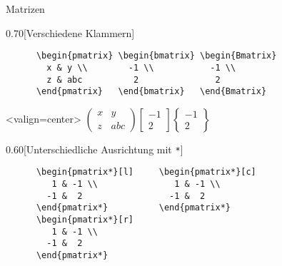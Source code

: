 \begin{frame}[fragile]{
  Matrizen
  \hfill{}
}
  \fontsize{8}{0.8\baselineskip}\selectfont
  \begin{CodeExample}{0.70}[Verschiedene Klammern]
    \begin{lstlisting}
      \begin{pmatrix} \begin{bmatrix} \begin{Bmatrix}
        x & y \\        -1 \\           -1 \\
        z & abc          2               2
      \end{pmatrix}   \end{bmatrix}   \end{Bmatrix}
    \end{lstlisting}
  \CodeResult<valign=center>
    $\displaystyle
      \begin{pmatrix}
        x & y \\
        z & abc
      \end{pmatrix}
      \begin{bmatrix}
        -1 \\
         2
      \end{bmatrix}
      \begin{Bmatrix}
        -1 \\
         2
      \end{Bmatrix}
    $
  \end{CodeExample}
  \begin{CodeExample}{0.60}[Unterschiedliche Ausrichtung mit \lstinline+*+]
    \begin{lstlisting}
      \begin{pmatrix*}[l]     \begin{pmatrix*}[c]
         1 & -1 \\               1 & -1 \\
        -1 &  2                 -1 &  2
      \end{pmatrix*}          \end{pmatrix*}
      \begin{pmatrix*}[r]
         1 & -1 \\
        -1 &  2
      \end{pmatrix*}
    \end{lstlisting}
  \CodeResult
\end{CodeExample}
\end{frame}
